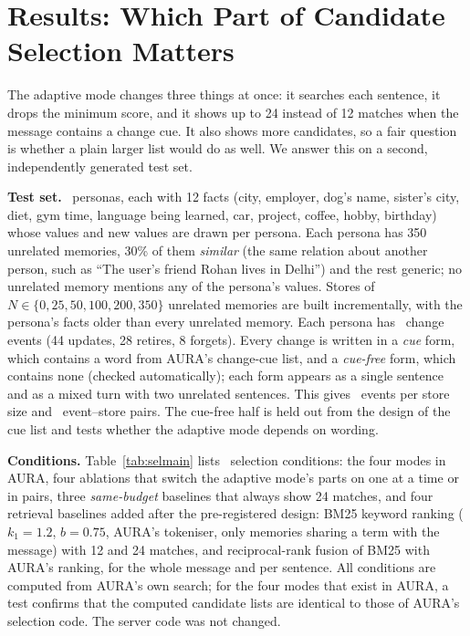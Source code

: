 \IfFileExists{IEEEtran.cls}{\documentclass[journal]{IEEEtran}\def\HAVEIEEE{1}}{\documentclass[10pt,twocolumn]{article}\usepackage[margin=0.7in,columnsep=0.25in]{geometry}}
\newcommand{\aura}{AURA}
\begin{document}
\section{Results: Which Part of Candidate Selection Matters}
\label{sec:selection}
The adaptive mode changes three things at once: it searches each sentence, it drops the minimum score, and it shows up to 24 instead of 12 matches when the message contains a change cue. It also shows more candidates, so a fair question is whether a plain larger list would do as well. We answer this on a second, independently generated test set.

\textbf{Test set.} \selPersonas\ personas, each with 12 facts (city, employer, dog's name, sister's city, diet, gym time, language being learned, car, project, coffee, hobby, birthday) whose values and new values are drawn per persona. Each persona has 350 unrelated memories, 30\% of them \emph{similar} (the same relation about another person, such as ``The user's friend Rohan lives in Delhi'') and the rest generic; no unrelated memory mentions any of the persona's values. Stores of $N\in\{0,25,50,100,200,350\}$ unrelated memories are built incrementally, with the persona's facts older than every unrelated memory. Each persona has \selEvents\ change events (44 updates, 28 retires, 8 forgets). Every change is written in a \emph{cue} form, which contains a word from \aura's change-cue list, and a \emph{cue-free} form, which contains none (checked automatically); each form appears as a single sentence and as a mixed turn with two unrelated sentences. This gives \selEventsTotal\ events per store size and \selRows\ event--store pairs. The cue-free half is held out from the design of the cue list and tests whether the adaptive mode depends on wording.

\textbf{Conditions.} Table~\ref{tab:selmain} lists \selNConditions\ selection conditions: the four modes in \aura, four ablations that switch the adaptive mode's parts on one at a time or in pairs, three \emph{same-budget} baselines that always show 24 matches, and four retrieval baselines added after the pre-registered design: BM25 keyword ranking ($k_1=1.2$, $b=0.75$, \aura's tokeniser, only memories sharing a term with the message) with 12 and 24 matches, and reciprocal-rank fusion of BM25 with \aura's ranking, for the whole message and per sentence. All conditions are computed from \aura's own search; for the four modes that exist in \aura, a test confirms that the computed candidate lists are identical to those of \aura's selection code. The server code was not changed.
\end{document}
